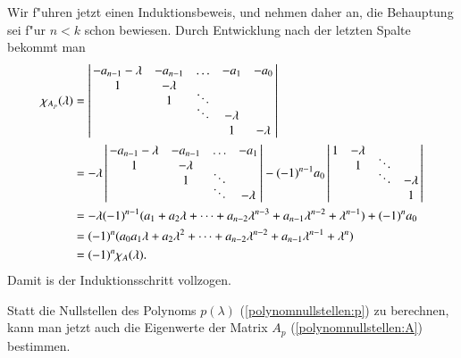 Wir f"uhren jetzt einen Induktionsbeweis, und nehmen daher an, die
Behauptung sei f"ur $n < k$ schon bewiesen.
Durch Entwicklung nach der letzten Spalte bekommt man
\begin{align*}
\chi_{A_p}(\lambda)
&=
\left|\,
\begin{matrix}
-a_{n-1}-\lambda&-a_{n-1}&\dots         &    -a_1&    -a_0\\
               1&-\lambda&              &        &        \\
                &       1&\smash{\ddots}&        &        \\
                &        &\smash{\ddots}&-\lambda&        \\
                &        &              &       1&-\lambda
\end{matrix}\,\right|
\\
&=
-\lambda
\left|\,
\begin{matrix}
-a_{n-1}-\lambda&-a_{n-1}&\dots         &    -a_1\\
               1&-\lambda&              &        \\
                &       1&\smash{\ddots}&        \\
                &        &\smash{\ddots}&-\lambda
\end{matrix}
\,\right|
-
(-1)^{n-1}
a_0
\left|\,
\begin{matrix}
               1&-\lambda&              &        \\
                &       1&\smash{\ddots}&        \\
                &        &\smash{\ddots}&-\lambda\\
                &        &              &       1
\end{matrix}
\,\right|
\\
&=
-\lambda (-1)^{n-1}(
a_1+a_2\lambda+\dots+a_{n-2}\lambda^{n-3}+a_{n-1}\lambda^{n-2}+\lambda^{n-1})
+(-1)^na_0\\
&=(-1)^n(a_0
a_1\lambda+a_2\lambda^2+\dots+a_{n-2}\lambda^{n-2}+a_{n-1}\lambda^{n-1}+\lambda^n)
\\
&=(-1)^n \chi_A(\lambda).
\end{align*}
Damit is der Induktionsschritt vollzogen.

Statt die Nullstellen des Polynoms $p(\lambda)$ (\ref{polynomnullstellen:p})
zu berechnen, kann man jetzt auch die Eigenwerte der Matrix
$A_p$ (\ref{polynomnullstellen:A}) bestimmen.

